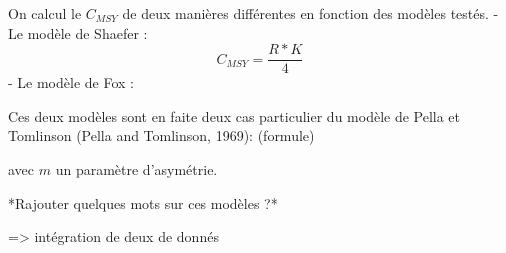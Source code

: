 \documentclass[a4paper,11pt,twoside,openany]{report}
\theoremstyle{plain}
\theoremstyle{definition}
\theoremstyle{remark}
\begin{document}
On calcul le $C_{MSY}$ de deux manières différentes en fonction des modèles testés. 
- Le modèle de Shaefer :
$$C_{MSY}=\dfrac{R*K}{4} $$
- Le modèle de Fox : 

Ces deux modèles sont en faite deux cas particulier du modèle de Pella et Tomlinson (Pella and Tomlinson, 1969):
(formule)

avec $m$ un paramètre d'asymétrie.

*Rajouter quelques mots sur ces modèles ?*

=> intégration de deux de donnés 




\end{document}
